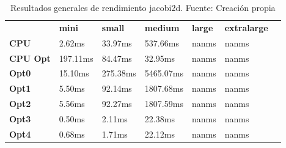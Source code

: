 \begin{table}[H]
    \centering
    \begin{tabular}{lllllll}
    \rowcolor[HTML]{DAE8FC} \ &  \textbf{mini} &  \textbf{small} &  \textbf{medium} &  \textbf{	large} &  \textbf{	extralarge} \\
    \cellcolor[HTML]{DAE8FC} \textbf{CPU} & 2.62ms & 33.97ms & 537.66ms & 	nanms & 	nanms \\
    \rowcolor[HTML]{EFEFEF} \cellcolor[HTML]{DAE8FC} \textbf{CPU Opt} & 197.11ms & 84.47ms & 32.95ms & 	nanms & 	nanms \\
    \cellcolor[HTML]{DAE8FC} \textbf{Opt0} & 15.10ms & 275.38ms & 5465.07ms & 	nanms & 	nanms \\
    \rowcolor[HTML]{EFEFEF} \cellcolor[HTML]{DAE8FC} \textbf{Opt1} & 5.50ms & 92.14ms & 1807.68ms & 	nanms & 	nanms \\
    \cellcolor[HTML]{DAE8FC} \textbf{Opt2} & 5.56ms & 92.27ms & 1807.59ms & 	nanms & 	nanms \\
    \rowcolor[HTML]{EFEFEF} \cellcolor[HTML]{DAE8FC} \textbf{Opt3} & 0.50ms & 2.11ms & 22.38ms & 	nanms & 	nanms \\
    \cellcolor[HTML]{DAE8FC} \textbf{Opt4} & 0.68ms & 1.71ms & 22.12ms & 	nanms & 	nanms \\
    \end{tabular}
    \caption[Resultados generales de rendimiento jacobi2d]{{Resultados generales de rendimiento jacobi2d. Fuente: Creación propia}}
    \label{table_global_jacobi2d_PerformanceResults_data}
\end{table}